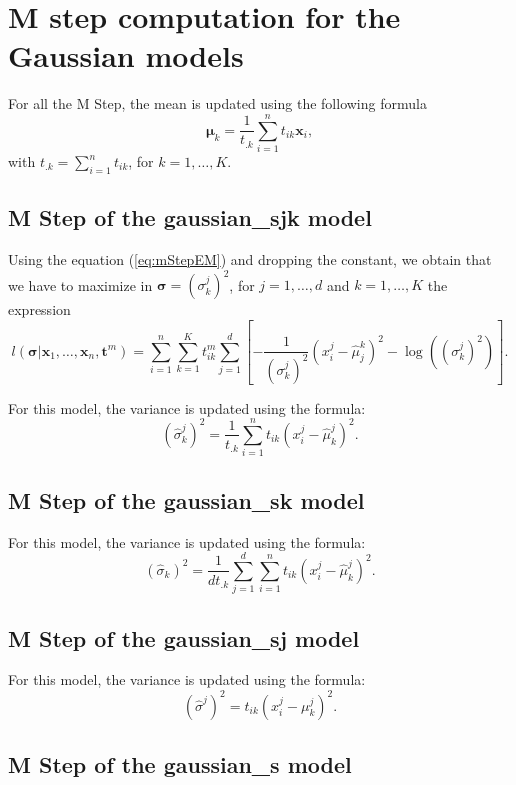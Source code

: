 \documentclass[a4paper,10pt]{article}
\newcommand{\bx}{\mathbf{x}}
\newcommand{\bt}{\mathbf{t}}
\newcommand{\bsigma}{\boldsymbol{\sigma}}
\newcommand{\bmu}{\boldsymbol{\mu}}
\begin{document}



\appendix

\section{M step computation for the Gaussian models}

For all the M Step, the mean is updated using the following formula
$$
{\bmu}_k = \frac{1}{t_{.k}} \sum_{i=1}^n t_{ik} \bx_i,
$$
with $t_{.k} = \sum_{i=1}^n t_{ik}$, for $k=1,\ldots,K$.


\subsection{M Step of the gaussian\_sjk model}

Using the equation (\ref{eq:mStepEM}) and dropping the constant, we obtain that we have to
maximize in $\bsigma = (\sigma^j_k)^2$, for $j=1,\ldots,d$ and $k=1,\ldots,K$ the expression
\begin{equation} \label{eq:gaussian_sjk}
l(\bsigma | {\bx}_{1},\ldots,{\bx}_{n}, {\bt}^m) = \sum_{i=1}^{n} \sum_{k=1}^{K} t_{ik}^m
     \sum_{j=1}^d \left[ - \frac{1}{(\sigma^j_k)^2} (x_i^j - \hat{\mu}_j^k)^2 - \log((\sigma^j_k)^2) \right].
\end{equation}

For this model, the variance is updated using the formula:
$$
(\hat{\sigma}^j_k)^2 = \frac{1}{t_{.k}} \sum_{i=1}^n t_{ik} (x^j_i-\hat{\mu}^j_k)^2.
$$

\subsection{M Step of the gaussian\_sk model}

For this model, the variance is updated using the formula:
$$
(\hat{\sigma}_k)^2 = \frac{1}{d t_{.k}} \sum_{j=1}^d\sum_{i=1}^n t_{ik} (x^j_i-\hat{\mu}^j_k)^2.
$$

\subsection{M Step of the gaussian\_sj model}

For this model, the variance is updated using the formula:
$$
(\hat{\sigma}^j)^2 =  t_{ik} (x^j_i-\mu^j_k)^2.
$$

\subsection{M Step of the gaussian\_s model}
\end{document}
